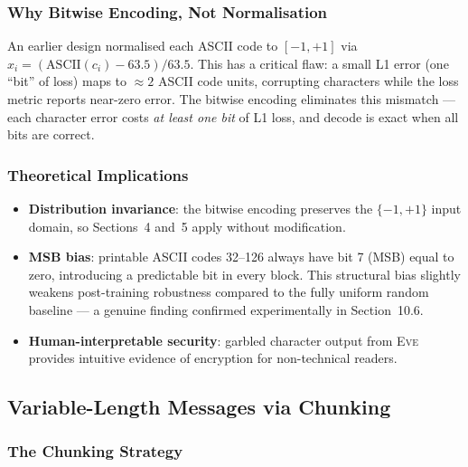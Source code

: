 \documentclass[12pt, a4paper]{article}
\newcommand{\eve}{\textsc{Eve}}
\begin{document}
\subsubsection*{Why Bitwise Encoding, Not Normalisation}

An earlier design normalised each ASCII code to $[-1,+1]$ via
$x_i = (\mathrm{ASCII}(c_i) - 63.5)/63.5$. This has a critical flaw:
a small L1 error (one ``bit'' of loss) maps to $\approx 2$ ASCII code
units, corrupting characters while the loss metric reports near-zero
error. The bitwise encoding eliminates this mismatch --- each character
error costs \emph{at least one bit} of L1 loss, and decode is exact
when all bits are correct.

\subsubsection*{Theoretical Implications}

\begin{itemize}[leftmargin=1.8em, itemsep=4pt]
  \item \textbf{Distribution invariance}: the bitwise encoding preserves
        the $\{-1,+1\}$ input domain, so Sections~4 and~5 apply without
        modification.
  \item \textbf{MSB bias}: printable ASCII codes 32--126 always have
        bit 7 (MSB) equal to zero, introducing a predictable bit in every
        block. This structural bias slightly weakens post-training
        robustness compared to the fully uniform random baseline --- a
        genuine finding confirmed experimentally in Section~10.6.
  \item \textbf{Human-interpretable security}: garbled character output
        from \eve{} provides intuitive evidence of encryption for
        non-technical readers.
\end{itemize}
\subsection{Variable-Length Messages via Chunking}
\label{subsec:mode_variable}

\subsubsection*{The Chunking Strategy}
\end{document}
